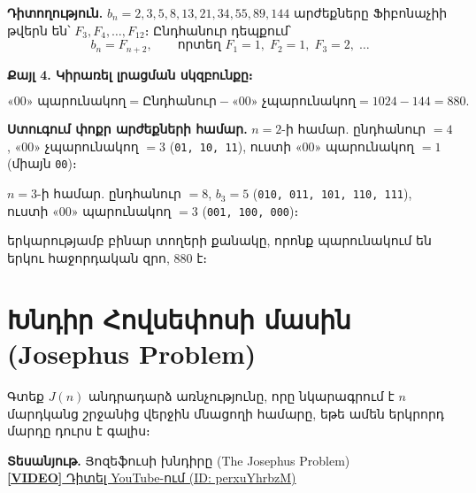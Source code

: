 \documentclass[12pt, a4paper]{article}
\begin{document}
\textbf{Դիտողություն.}\; $b_n = 2, 3, 5, 8, 13, 21, 34, 55, 89, 144$ արժեքները
Ֆիբոնաչիի թվերն են՝ $F_3, F_4, \ldots, F_{12}$։
Ընդհանուր դեպքում՝
\[
  \boxed{b_n = F_{n+2}}, \qquad \text{որտեղ } F_1 = 1,\; F_2 = 1,\; F_3 = 2,\; \ldots
\]

\textbf{Քայլ 4. Կիրառել լրացման սկզբունքը։}

\[
  \text{«$00$» պարունակող} = \text{Ընդհանուր} - \text{«$00$» չպարունակող}
  = 1024 - 144 = \boxed{880}.
\]

\textbf{Ստուգում փոքր արժեքների համար.}\;
$n = 2$-ի համար. ընդհանուր $= 4$, «$00$» չպարունակող $= 3$ (\texttt{01, 10, 11}),
ուստի «$00$» պարունակող $= 1$ (միայն \texttt{00})։ \checkmark

$n = 3$-ի համար. ընդհանուր $= 8$, $b_3 = 5$ (\texttt{010, 011, 101, 110, 111}),
ուստի «$00$» պարունակող $= 3$ (\texttt{001, 100, 000})։ \checkmark

\begin{answerbox}
 երկարությամբ բինար տողերի քանակը, որոնք պարունակում են երկու հաջորդական զրո, \(\boxed{880}\) է։
\end{answerbox}

\newpage
\section{Խնդիր Հովսեփոսի մասին (Josephus Problem)}

\begin{problembox}
Գտեք $J(n)$ անդրադարձ առնչությունը, որը նկարագրում է $n$ մարդկանց շրջանից վերջին մնացողի համարը, եթե ամեն երկրորդ մարդը դուրս է գալիս։
\end{problembox}

\begin{tcolorbox}[colback=white, colframe=gray!50, arc=2mm, width=0.9\textwidth, halign=center]
  \textbf{Տեսանյութ.} Յոզեֆուսի խնդիրը (The Josephus Problem) \\
  \href{https://youtu.be/perxuYhrbzM}{\textbf{[VIDEO]} Դիտել YouTube-ում (ID: perxuYhrbzM)}
\end{tcolorbox}
\end{document}
